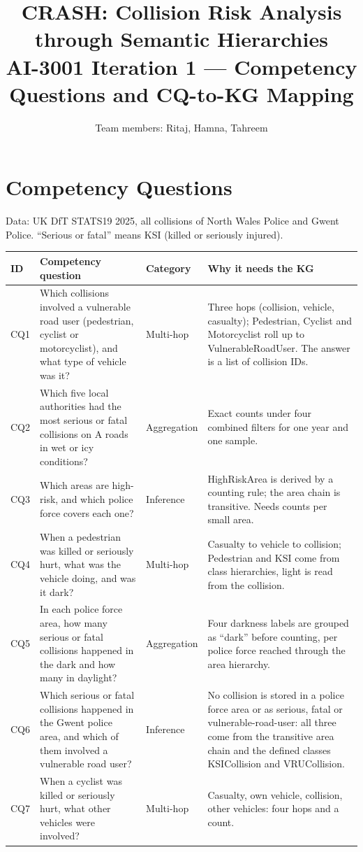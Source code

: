 \documentclass[11pt,a4paper]{article}
\title{CRASH: Collision Risk Analysis through Semantic Hierarchies\\[4pt]
\large AI-3001 Iteration 1 --- Competency Questions and CQ-to-KG Mapping}
\date{}
\author{Team members: Ritaj, Hamna, Tahreem}
\newcommand{\cls}[1]{\textsf{#1}}
\begin{document}
\maketitle
\section{Competency Questions}
Data: UK DfT STATS19 2025, all collisions of North Wales Police and Gwent Police. ``Serious or fatal'' means KSI (killed or seriously injured).
\small
\begin{longtable}{L{0.9cm} L{6.0cm} L{2.1cm} L{6.6cm}}
\toprule
\textbf{ID} & \textbf{Competency question} & \textbf{Category} & \textbf{Why it needs the KG}\\
\midrule
\endhead
CQ1 & Which collisions involved a vulnerable road user (pedestrian, cyclist or motorcyclist), and what type of vehicle was it? & Multi-hop & Three hops (collision, vehicle, casualty); \cls{Pedestrian}, \cls{Cyclist} and \cls{Motorcyclist} roll up to \cls{VulnerableRoadUser}. The answer is a list of collision IDs.\\
CQ2 & Which five local authorities had the most serious or fatal collisions on A roads in wet or icy conditions? & Aggregation & Exact counts under four combined filters for one year and one sample.\\
CQ3 & Which areas are high-risk, and which police force covers each one? & Inference & \cls{HighRiskArea} is derived by a counting rule; the area chain is transitive. Needs counts per small area.\\
CQ4 & When a pedestrian was killed or seriously hurt, what was the vehicle doing, and was it dark? & Multi-hop & Casualty to vehicle to collision; \cls{Pedestrian} and KSI come from class hierarchies, light is read from the collision.\\
CQ5 & In each police force area, how many serious or fatal collisions happened in the dark and how many in daylight? & Aggregation & Four darkness labels are grouped as ``dark'' before counting, per police force reached through the area hierarchy.\\
CQ6 & Which serious or fatal collisions happened in the Gwent police area, and which of them involved a vulnerable road user? & Inference & No collision is stored in a police force area or as serious, fatal or vulnerable-road-user: all three come from the transitive area chain and the defined classes \cls{KSICollision} and \cls{VRUCollision}.\\
CQ7 & When a cyclist was killed or seriously hurt, what other vehicles were involved? & Multi-hop & Casualty, own vehicle, collision, other vehicles: four hops and a count.\\

\end{longtable}
\end{document}
